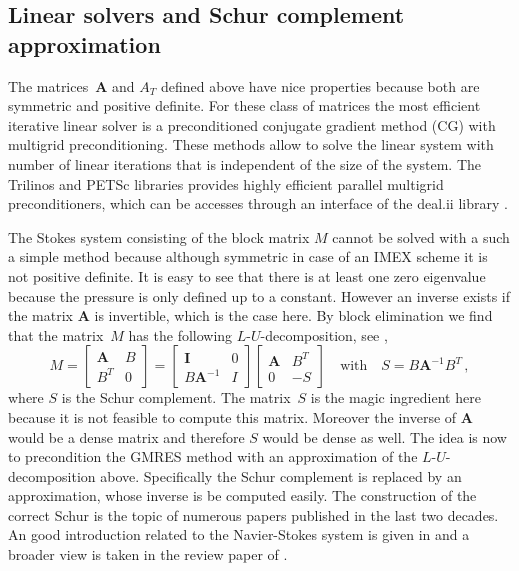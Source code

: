 \subsection{Linear solvers and Schur complement approximation}
The matrices~$\bm{A}$ and $A_T$ defined above have nice properties because both are symmetric and positive definite. For these class of matrices the most efficient iterative linear solver is a preconditioned conjugate gradient method (CG) with multigrid preconditioning. These methods allow to solve the linear system with number of linear iterations that is independent of the size of the system. The Trilinos and PETSc libraries provides highly efficient parallel multigrid preconditioners, which can be accesses through an interface of the deal.ii library \cite{deal.ii-9.0,Trilinos,PETSc}.

The Stokes system consisting of the block matrix $M$ cannot be solved with a such a simple method because although symmetric in case of an IMEX scheme it is not positive definite. It is easy to see that there is at least one zero eigenvalue because the pressure is only defined up to a constant. However an inverse exists if the matrix $\mathbf{A}$ is invertible, which is the case here. By block elimination we find that the matrix~$M$ has the following $L$-$U$-decomposition, see \cite{Elman2014},
\begin{equation}
	M
	=\begin{bmatrix} \mathbf{A} & B\\ B^T & 0 \end{bmatrix}
	=\begin{bmatrix} \mathbf{I} & 0\\ B\mathbf{A}^{-1} & I \end{bmatrix}
	\begin{bmatrix} \mathbf{A} & B^T\\ 0 & -S \end{bmatrix}\quad\text{with}\quad
	S=B\mathbf{A}^{-1}B^T\,,
	\label{eqn:StokesLU}
\end{equation}
where $S$ is the Schur complement. The matrix~$S$ is the magic ingredient here because it is not feasible to compute this matrix. Moreover the inverse of $\mathbf{A}$ would be a dense matrix and therefore $S$ would be dense as well. The idea is now to precondition the GMRES method with an approximation of the $L$-$U$-decomposition above. Specifically the Schur complement is replaced by an approximation, whose inverse is be computed easily. The construction of the correct Schur is the topic of numerous papers published in the last two decades. An good introduction related to the Navier-Stokes system is given in \cite{Elman2014} and a broader view is taken in the review paper of \citeauthor{Benzi2005}.

